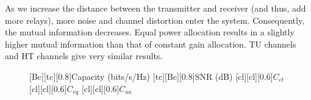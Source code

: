 As we increase the distance between the transmitter and receiver (and thus, add more relays), more noise and channel distortion enter the system.  Consequently, the mutual information decreases.  Equal power allocation results in a slightly higher mutual information than that of constant gain allocation.  TU channels and HT channels give very similar results.

\begin{figure}
    [Bc][tc][0.8]{Capacity (bits/s/Hz)}
    [tc][Bc][0.8]{SNR (dB)}
    [cl][cl][0.6]{$C_{ct}$}
    [cl][cl][0.6]{$C_{eq}$}
    [cl][cl][0.6]{$C_{aa}$}
\centerline{
	 \\
}
\centerline{
}
\end{figure}
